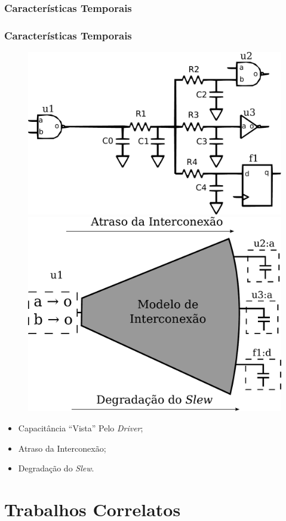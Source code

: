 \documentclass[10pt,a4paper]{beamer}
\begin{document}
			\subsubsection*{Características Temporais}
			\begin{frame}
				\frametitle{Características Temporais}
				
				
					\begin{figure}
						\subfigure
						{
						\includegraphics[width=0.4 \textwidth]{img/modelagem1.pdf}
						}
						\subfigure
						{
						\includegraphics[width=0.4 \textwidth]{img/modelagem2.pdf}
						}
						
					\end{figure}
					\pause
					\begin{itemize}[<+->]
						\item Capacitância ``Vista'' Pelo \textit{Driver};
						\item Atraso da Interconexão;
						\item Degradação do \textit{Slew}. 		
					\end{itemize}
			\end{frame}
	
	\section{Trabalhos Correlatos}
	
\end{document}
